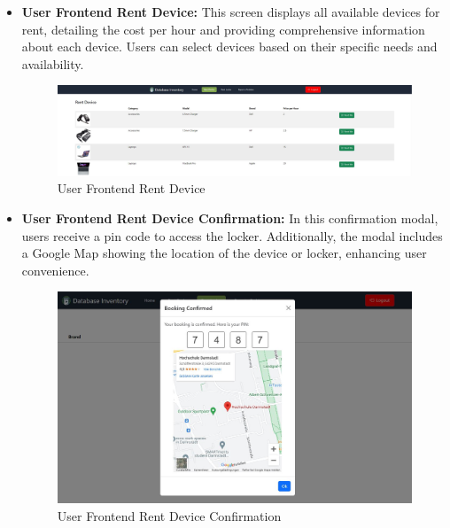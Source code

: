 \begin{itemize}
\item \textbf{User Frontend Rent Device: } This screen displays all available devices for rent, detailing the cost per hour and providing comprehensive information about each device. Users can select devices based on their specific needs and availability.
\begin{figure}[h]
    \centering
    \includegraphics[width=1\linewidth]{images/rent device.JPG}
    \caption{User Frontend Rent Device}
    \label{fig:rent-device-dashboard}
\end{figure}
\newpage
\item \textbf{User Frontend Rent Device Confirmation: } In this confirmation modal, users receive a pin code to access the locker. Additionally, the modal includes a Google Map showing the location of the device or locker, enhancing user convenience.
\begin{figure}[h]
    \centering
    \includegraphics[width=1\linewidth]{images/booking conf.JPG}
    \caption{User Frontend Rent Device Confirmation}
    \label{fig:rent-device-confirmation-modal}
\end{figure}


\end{itemize}
